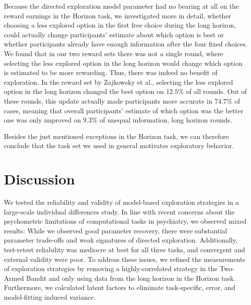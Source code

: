 \documentclass[fleqn,10pt]{wlscirep}
\begin{document}
Because the directed exploration model parameter had no bearing at all on the reward earnings in the Horizon task, we investigated more in detail, whether choosing a less explored option in the first free choice during the long horizon, could actually change participants' estimate about which option is best or whether participants already have enough information after the four fixed choices. We found that in our two reward sets there was not a single round, where selecting the less explored option in the long horizon would change which option is estimated to be more rewarding. Thus, there was indeed no benefit of exploration. In the reward set by Zajkowsky et al.\cite{zajkowski_causal_2017}, selecting the less explored option in the long horizon changed the best option on $12.5\%$ of all rounds. Out of these rounds, this update actually made participants more accurate in $74.7\%$ of cases, meaning that overall participants' estimate of which option was the better one was only improved on $9.3\%$ of unequal information, long horizon rounds. 

Besides the just mentioned exceptions in the Horizon task, we can therefore conclude that the task set we used in general motivates exploratory behavior.

\section*{Discussion}

We tested the reliability and validity of model-based exploration strategies in a large-scale individual differences study. In line with recent concerns about the psychometric limitations of computational tasks in psychiatry\cite{karvelis_individual_2023}, we observed mixed results: While we observed good parameter recovery, there were substantial parameter trade-offs and weak signatures of directed exploration. Additionally, test-retest reliability was mediocre at best for all three tasks, and convergent and external validity were poor. To address these issues, we refined the measurements of exploration strategies by removing a highly-correlated strategy in the Two-Armed Bandit and only using data from the long horizon in the Horizon task. Furthermore, we calculated latent factors to eliminate task-specific, error, and model-fitting induced variance.
\end{document}
